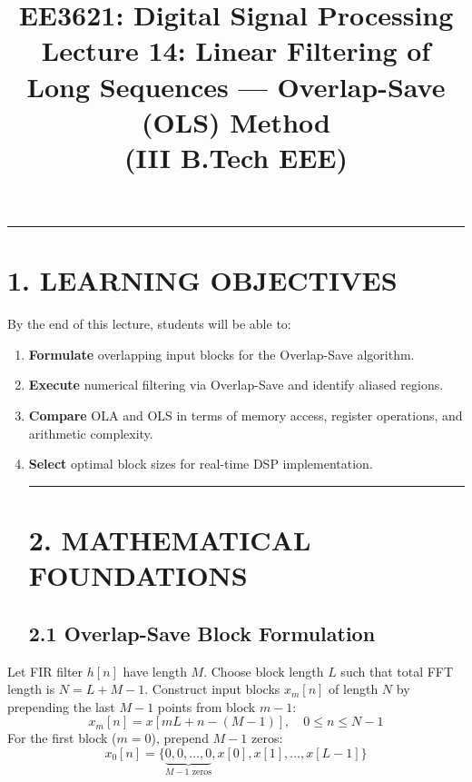 \documentclass[11pt,a4paper]{article}
\begin{document}
\title{\textbf{EE3621: Digital Signal Processing} \\ \Large Lecture 14: Linear Filtering of Long Sequences — Overlap-Save (OLS) Method \\ \large (III B.Tech EEE)}\maketitle

\noindent\rule{\textwidth}{0.5pt}
\section*{1. LEARNING OBJECTIVES}
By the end of this lecture, students will be able to:
\begin{enumerate}
\item \textbf{Formulate} overlapping input blocks for the Overlap-Save algorithm.
\item \textbf{Execute} numerical filtering via Overlap-Save and identify aliased regions.
\item \textbf{Compare} OLA and OLS in terms of memory access, register operations, and arithmetic complexity.
\item \textbf{Select} optimal block sizes for real-time DSP implementation.

\noindent\rule{\textwidth}{0.5pt}
\section*{2. MATHEMATICAL FOUNDATIONS}

\subsection*{2.1 Overlap-Save Block Formulation}
\end{enumerate}
Let FIR filter $h[n]$ have length $M$. Choose block length $L$ such that total FFT length is $N = L + M - 1$.
Construct input blocks $x_m[n]$ of length $N$ by prepending the last $M-1$ points from block $m-1$:
$$ x_m[n] = x[mL + n - (M-1)], \quad 0 \le n \le N-1 $$
For the first block ($m=0$), prepend $M-1$ zeros:
$$ x_0[n] = \{ \underbrace{0, 0, \dots, 0}_{M-1 \text{ zeros}}, x[0], x[1], \dots, x[L-1] \} $$
\end{document}
